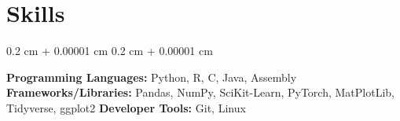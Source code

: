 \documentclass[10pt, letterpaper]{article}
\newenvironment{onecolentry}{
    \begin{adjustwidth}{
        0.2 cm + 0.00001 cm
    }{
        0.2 cm + 0.00001 cm
    }
}{
    \end{adjustwidth}
} %
\begin{document}
    \section{Skills}
        \begin{onecolentry}
            \textbf{Programming Languages:} Python, R, C, Java, Assembly \newline
            \textbf{Frameworks/Libraries:} Pandas, NumPy, SciKit-Learn, PyTorch, MatPlotLib, Tidyverse, ggplot2 \newline
            \textbf{Developer Tools:} Git, Linux

        \end{onecolentry}


    \vspace{0.20 cm}

    

    
\end{document}

